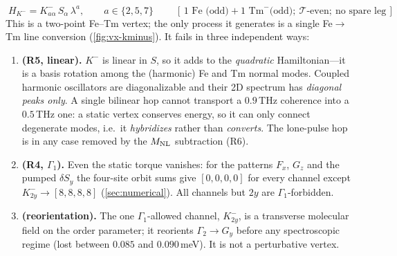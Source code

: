 \documentclass[11pt,a4paper]{article}
\begin{document}
\begin{equation}
  \boxed{\;H_{K^-}=K^-_{a\alpha}\,S_\alpha\,\lambda^a,\qquad a\in\{2,5,7\}\;}
  \qquad[\,\text{1 Fe (odd)}+\text{1 Tm}^-\text{(odd)};\ \mathcal T\text{-even};\ \text{no spare leg}\,]
\end{equation}
This is a two-point Fe--Tm vertex; the only process it generates is a single
Fe$\to$Tm line conversion (\cref{fig:vx-kminus}).  It fails in three independent
ways:
\begin{enumerate}
\item \textbf{(R5, linear).}  $K^-$ is linear in $S$, so it adds to the
\emph{quadratic} Hamiltonian---it is a basis rotation among the (harmonic) Fe
and Tm normal modes.  Coupled harmonic oscillators are diagonalizable and their
2D spectrum has \emph{diagonal peaks only}.  A single bilinear hop cannot
transport a $0.9\,$THz coherence into a $0.5\,$THz one: a static vertex
conserves energy, so it can only connect degenerate modes, i.e.\ it
\emph{hybridizes} rather than \emph{converts}.  The lone-pulse hop is in any
case removed by the $M_{\rm NL}$ subtraction (R6).
\item \textbf{(R4, $\Gamma_1$).}  Even the static torque vanishes: for the
patterns $F_x$, $G_z$ and the pumped $\delta S_y$ the four-site orbit sums give
$[0,0,0,0]$ for every channel except $K^-_{2y}\!\to\![8,8,8,8]$
(\cref{sec:numerical}).  All channels but $2y$ are $\Gamma_1$-forbidden.
\item \textbf{(reorientation).}  The one $\Gamma_1$-allowed channel, $K^-_{2y}$,
is a transverse molecular field on the order parameter; it reorients
$\Gamma_2\!\to\!G_y$ before any spectroscopic regime (lost between $0.085$ and
$0.090\,$meV).  It is not a perturbative vertex.
\end{enumerate}
\end{document}
